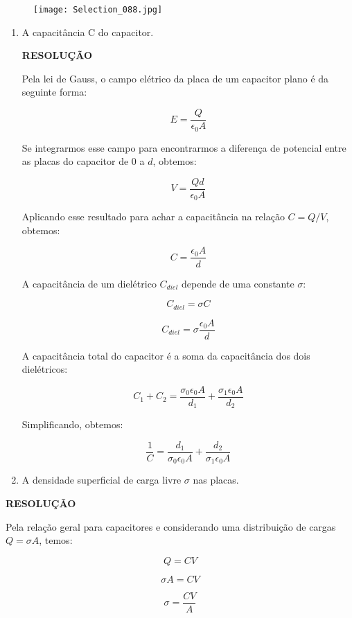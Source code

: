 \documentclass[11pt,a4paper]{article}
\begin{document}
\begin{enumerate}
\begin{figure}[h]	
\centering %
\texttt{[image: Selection\_088.jpg]} 
\end{figure}

\begin{enumerate}
\item A capacitância C do capacitor.

\textbf{RESOLUÇÃO}

Pela lei de Gauss, o campo elétrico da placa de um capacitor plano é da seguinte forma:

$$E = \displaystyle\dfrac{Q}{\epsilon_0 A}$$

Se integrarmos esse campo para encontrarmos a diferença de potencial entre as placas do capacitor de $0$ a $d$, obtemos:

$$V = \displaystyle\dfrac{Qd}{\epsilon_0 A}$$

Aplicando esse resultado para achar a capacitância na relação $C = Q/V$, obtemos:

$$C = \displaystyle\dfrac{\epsilon_0 A}{d}$$

A capacitância de um dielétrico $C_{diel}$ depende de uma constante $\sigma$:

$$C_{diel} = \sigma C$$

$$C_{diel} = \sigma \displaystyle\dfrac{\epsilon_0 A}{d}$$

A capacitância total do capacitor é a soma da capacitância dos dois dielétricos:

$$C_1 + C_2 = \displaystyle\dfrac{\sigma_0\epsilon_0 A}{d_1} + \displaystyle\dfrac{\sigma_1\epsilon_0 A}{d_2}$$

Simplificando, obtemos:

$$\displaystyle\dfrac{1}{C} = \displaystyle\dfrac{d_1}{\sigma_0 \epsilon_0 A} + \displaystyle\dfrac{d_2}{\sigma_1 \epsilon_0 A}$$

\item A densidade superficial de carga livre $\sigma$ nas placas.
\end{enumerate}

\textbf{RESOLUÇÃO}

Pela relação geral para capacitores e considerando uma distribuição de cargas $Q = \sigma A$, temos:

$$Q = C V$$

$$\sigma A = C V$$

$$\sigma = \displaystyle\dfrac{CV}{A}$$



\end{enumerate}
	
\end{document}
